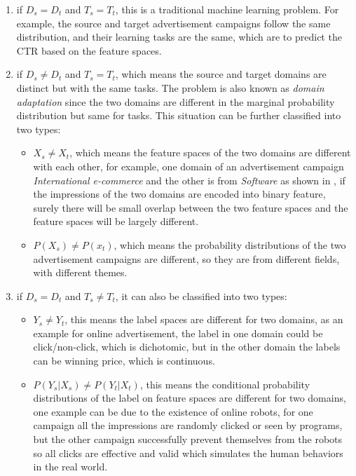 \begin{enumerate}
\item if \(D_s = D_t\) and \(T_s = T_t\), this is a traditional machine learning problem. For example, the source and target advertisement campaigns follow the same distribution, and their learning tasks are the same, which are to predict the CTR based on the feature spaces. 

\item if  \(D_s \neq D_t\) and \(T_s = T_t\), which means the source and target domains are distinct but with the same tasks. The problem is also known as \textit{domain adaptation} \cite{arnold2007comparative} since the two domains are different in the marginal probability distribution but same for tasks. This situation can be further classified into two types:
    \begin{itemize}
    \item  \(X_s \neq X_t\), which means the feature spaces of the two domains are different with each other, for example, one domain of an advertisement campaign  \textit{International e-commerce} and the other is from \textit{ Software} as shown in \cite{zhang2014real}, if the impressions of the two domains are encoded into binary feature, surely there will be small overlap between the two feature spaces and the feature spaces will be largely different.
    \item \(P(X_s) \neq P(x_t) \), which means the probability distributions of the two advertisement campaigns are different, so they are from different fields, with different themes. 
    
    \end{itemize}
\item if  \(D_s = D_t\) and \(T_s \neq T_t\), it can also be classified into two types:
     \begin{itemize}
    \item  \(Y_s \neq Y_t\), this means the label spaces are different for two domains, as an example for online advertisement, the label in one domain could be click/non-click, which is dichotomic, but in the other domain the labels can be winning price, which is continuous.
    \item \(P(Y_s|X_s) \neq P(Y_t|X_t) \), this means the conditional probability distributions of the label on feature spaces are different for two domains, one example can be due to the existence of online robots, for one campaign all the impressions are randomly clicked or seen by programs, but the other campaign successfully prevent themselves from the robots so all clicks are effective and valid which simulates the human behaviors in the real world.  
  \end{itemize}
\end{enumerate}

